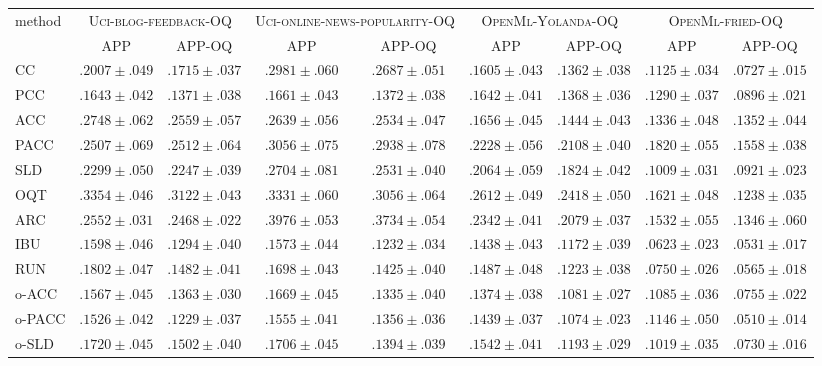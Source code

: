 \begin{tabular}{lcccccccc}
  \toprule
  \multirow{2}{*}{method} & \multicolumn{2}{c}{\textsc{Uci-blog-feedback-OQ}} & \multicolumn{2}{c}{\textsc{Uci-online-news-popularity-OQ}} & \multicolumn{2}{c}{\textsc{OpenMl-Yolanda-OQ}} & \multicolumn{2}{c}{\textsc{OpenMl-fried-OQ}} \\
  & APP & APP-OQ & APP & APP-OQ & APP & APP-OQ & APP & APP-OQ \\
  \midrule
  CC & ${.2007 \pm .049}$ & ${.1715 \pm .037}$ & ${.2981 \pm .060}$ & ${.2687 \pm .051}$ & ${.1605 \pm .043}$ & ${.1362 \pm .038}$ & ${.1125 \pm .034}$ & ${.0727 \pm .015}$ \\
  PCC & ${.1643 \pm .042}$ & ${.1371 \pm .038}$ & ${.1661 \pm .043}$ & ${.1372 \pm .038}$ & ${.1642 \pm .041}$ & ${.1368 \pm .036}$ & ${.1290 \pm .037}$ & ${.0896 \pm .021}$ \\
  ACC & ${.2748 \pm .062}$ & ${.2559 \pm .057}$ & ${.2639 \pm .056}$ & ${.2534 \pm .047}$ & ${.1656 \pm .045}$ & ${.1444 \pm .043}$ & ${.1336 \pm .048}$ & ${.1352 \pm .044}$ \\
  PACC & ${.2507 \pm .069}$ & ${.2512 \pm .064}$ & ${.3056 \pm .075}$ & ${.2938 \pm .078}$ & ${.2228 \pm .056}$ & ${.2108 \pm .040}$ & ${.1820 \pm .055}$ & ${.1558 \pm .038}$ \\
  SLD & ${.2299 \pm .050}$ & ${.2247 \pm .039}$ & ${.2704 \pm .081}$ & ${.2531 \pm .040}$ & ${.2064 \pm .059}$ & ${.1824 \pm .042}$ & ${.1009 \pm .031}$ & ${.0921 \pm .023}$ \\[.5em]
  OQT & ${.3354 \pm .046}$ & ${.3122 \pm .043}$ & ${.3331 \pm .060}$ & ${.3056 \pm .064}$ & ${.2612 \pm .049}$ & ${.2418 \pm .050}$ & ${.1621 \pm .048}$ & ${.1238 \pm .035}$ \\
  ARC & ${.2552 \pm .031}$ & ${.2468 \pm .022}$ & ${.3976 \pm .053}$ & ${.3734 \pm .054}$ & ${.2342 \pm .041}$ & ${.2079 \pm .037}$ & ${.1532 \pm .055}$ & ${.1346 \pm .060}$ \\
  IBU & ${.1598 \pm .046}$ & ${.1294 \pm .040}$ & ${.1573 \pm .044}$ & $\mathbf{.1232 \pm .034}$ & ${.1438 \pm .043}$ & ${.1172 \pm .039}$ & $\mathbf{.0623 \pm .023}$ & ${.0531 \pm .017}$ \\
  RUN & ${.1802 \pm .047}$ & ${.1482 \pm .041}$ & ${.1698 \pm .043}$ & ${.1425 \pm .040}$ & ${.1487 \pm .048}$ & ${.1223 \pm .038}$ & ${.0750 \pm .026}$ & ${.0565 \pm .018}$ \\[.5em]
  o-ACC & ${.1567 \pm .045}$ & ${.1363 \pm .030}$ & ${.1669 \pm .045}$ & ${.1335 \pm .040}$ & $\mathbf{.1374 \pm .038}$ & $\mathbf{.1081 \pm .027}$ & ${.1085 \pm .036}$ & ${.0755 \pm .022}$ \\
  o-PACC & $\mathbf{.1526 \pm .042}$ & $\mathbf{.1229 \pm .037}$ & $\mathbf{.1555 \pm .041}$ & ${.1356 \pm .036}$ & ${.1439 \pm .037}$ & $\mathbf{.1074 \pm .023}$ & ${.1146 \pm .050}$ & $\mathbf{.0510 \pm .014}$ \\
  o-SLD & ${.1720 \pm .045}$ & ${.1502 \pm .040}$ & ${.1706 \pm .045}$ & ${.1394 \pm .039}$ & ${.1542 \pm .041}$ & ${.1193 \pm .029}$ & ${.1019 \pm .035}$ & ${.0730 \pm .016}$ \\
  \bottomrule
\end{tabular}
